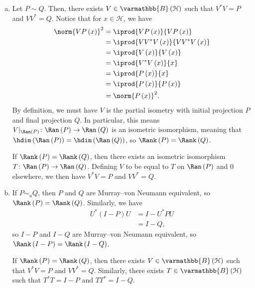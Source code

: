 \documentclass[10pt]{mypackage}
\renewcommand*{\mathbb}[1]{\varmathbb{#1}}
\newcommand{\B}{\mathbb{B}}
\begin{document}
\begin{solution}\hfill
  \begin{enumerate}[(a)]
    \item Let $P\sim Q$. Then, there exists $V\in \B\left(\mathcal{H}\right)$ such that $V^{\ast}V = P$ and $VV^{\ast} = Q$. Notice that for $x\in \mathcal{H}$, we have
      \begin{align*}
        \norm{VP\left(x\right)}^2 &= \iprod{VP\left(x\right)}{VP\left(x\right)}\\
                                  &= \iprod{VV^{\ast}V\left(x\right)}{VV^{\ast}V\left(x\right)}\\
                                  &= \iprod{V\left(x\right)}{V\left(x\right)}\\
                                  &= \iprod{V^{\ast}V\left(x\right)}{x}\\
                                  &= \iprod{P\left(x\right)}{x}\\
                                  &= \iprod{P\left(x\right)}{P\left(x\right)}\\
                                  &= \norm{P\left(x\right)}^2.
      \end{align*}
      By definition, we must have $V$ is the partial isometry with initial projection $P$ and final projection $Q$. In particular, this means $V|_{\Ran\left(P\right)}\colon \Ran\left(P\right)\rightarrow \Ran\left(Q\right)$ is an isometric isomorphism, meaning that $\hdim\left(\Ran\left(P\right)\right) =\hdim\left(\Ran\left(Q\right)\right)$, so $\Rank\left(P\right) = \Rank\left(Q\right)$.\newline

      If $\Rank\left(P\right) = \Rank\left(Q\right)$, then there exists an isometric isomorphism $T\colon \Ran\left(P\right)\rightarrow \Ran\left(Q\right)$. Defining $V$ to be equal to $T$ on $\Ran\left(P\right)$ and $0$ elsewhere, we then have $V^{\ast}V = P$ and $VV^{\ast} = Q$.
    \item If $P\sim_{u}Q$, then $P$ and $Q$ are Murray--von Neumann equivalent, so $\Rank\left(P\right) = \Rank\left(Q\right)$. Similarly, we have
      \begin{align*}
        U^{\ast}\left(I-P\right)U &= I-U^{\ast}PU\\
                                  &= I-Q,
      \end{align*}
      so $I-P$ and $I-Q$ are Murray--von Neumann equivalent, so $\Rank\left(I-P\right) = \Rank\left(I-Q\right)$.\newline

      If $\Rank\left(P\right) = \Rank\left(Q\right)$, then there exists $V\in \B\left(\mathcal{H}\right)$ such that $V^{\ast}V = P$ and $VV^{\ast} = Q$. Similarly, there exists $T\in \B\left(\mathcal{H}\right)$ such that $T^{\ast}T = I-P$ and $TT^{\ast} = I-Q$.
  \end{enumerate}
\end{solution}
\end{document}
